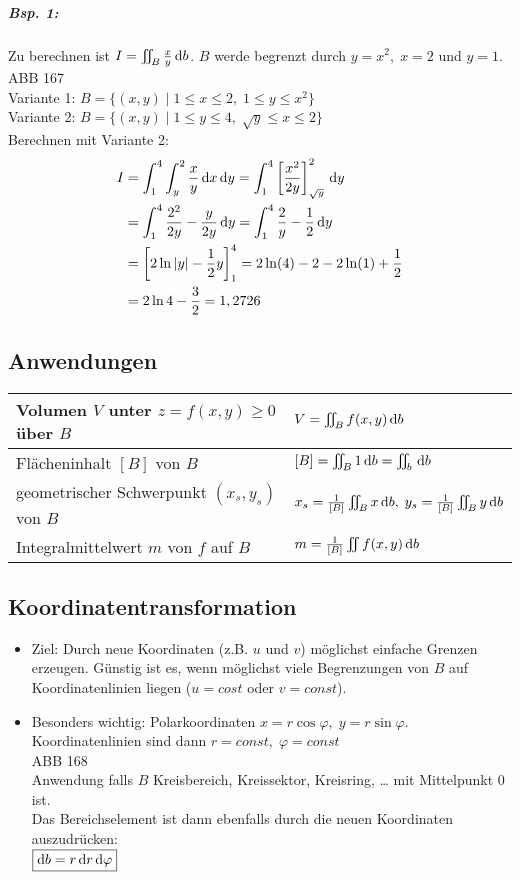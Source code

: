 \subparagraph{Bsp. 1:} Zu berechnen ist $I=\iint_B \frac{x}{y} \,\mathrm{d}b$. $B$ werde begrenzt durch $y=x^2, \; x=2$ und $y=1$.\\
ABB 167\\
Variante 1: $B=\{(x,y)\;|\; 1\leq x \leq 2,\; 1\leq y \leq x^2\}$\\
Variante 2: $B=\{(x,y)\;|\; 1\leq y \leq 4,\; \sqrt{y}\leq x \leq 2\}$\\
Berechnen mit Variante 2:
\begin{align*}
I &= \int_1^4\int_y^2 \frac{x}{y}\,\mathrm{d}x\,\mathrm{d}y=\int_1^4\left[ \frac{x^2}{2y}\right]_{\sqrt{y}}^2\,\mathrm{d}y\\
&=\int_1^4\frac{2^2}{2y}-\frac{y}{2y}\,\mathrm{d}y=\int_1^4 \frac{2}{y}-\frac{1}{2}\,\mathrm{d}y\\
&=\left[ 2 \ln|y| - \frac{1}{2}y\right]_1^4=2\ln(4)-2-2\ln(1)+\frac{1}{2}\\
&= 2 \ln 4- \frac{3}{2}=1,2726
\end{align*}

\subsection{Anwendungen}
\begin{tabular}{L{0.5} | L{0.4}}
Volumen $V$ unter $z=f(x,y)\geq 0$ über $B$ & $V=\iint_B f(x,y) \,\mathrm{d}b$\\
\hline
Flächeninhalt $[B]$ von $B$ & $[B]=\iint_B 1 \,\mathrm{d}b = \iint_b \,\mathrm{d}b$\\
\hline
geometrischer Schwerpunkt $(x_s, y_s)$ von $B$ & $x_s=\frac{1}{[B]}\iint_B x \,\mathrm{d}b, \; y_s=\frac{1}{[B]}\iint_B y \,\mathrm{d}b$\\
\hline 
Integralmittelwert $m$ von $f$ auf $B$ & $m=\frac{1}{[B]}\iint f(x,y) \,\mathrm{d}b$
\end{tabular}

\subsection{Koordinatentransformation}
\begin{itemize}
\item Ziel: Durch neue Koordinaten (z.B. $u$ und $v$) möglichst einfache Grenzen erzeugen. Günstig ist es, wenn möglichst viele Begrenzungen von $B$ auf Koordinatenlinien liegen ($u=cost$ oder $v=const$).
\item Besonders wichtig: Polarkoordinaten $x=r\cos \varphi,\; y=r\sin \varphi$. Koordinatenlinien sind dann $r=const, \; \varphi = const$\\
ABB 168\\
Anwendung falls $B$ Kreisbereich, Kreissektor, Kreisring, … mit Mittelpunkt $0$ ist.\\
Das Bereichselement ist dann ebenfalls durch die neuen Koordinaten auszudrücken:\\
$\boxed{\mathrm{d}b=r\,\mathrm{d}r\,\mathrm{d}\varphi}$
\end{itemize}

